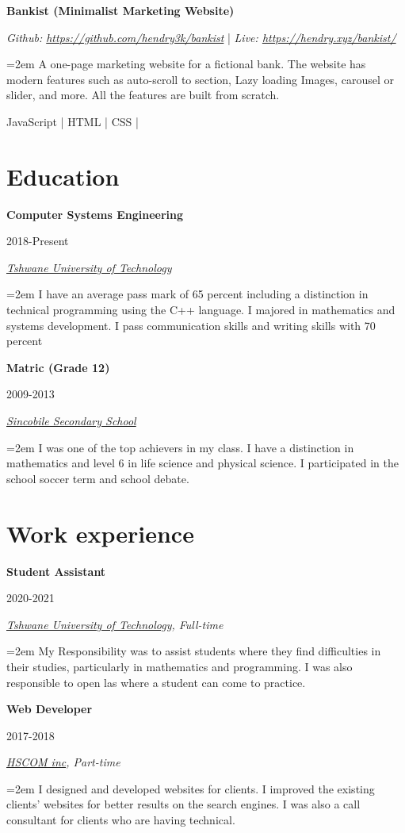 \documentclass[papei=a4,fontsize=12pt]{scrartcl} %
\newcommand{\sepspace}{\vspace*{1em}}		%
\newcommand{\NewPart}[1]{\section*{#1}}
\newcommand{\EducationEntry}[4]{
		\noindent \textbf{#1} \hfill      %
		\colorbox{Black!50}{%
			\parbox{6em}{%
			\hfill\color{White}#2}} \par  %
		\noindent \textit{#3} \par        %
		\noindent\hangindent=2em\hangafter=0 \small #4 %
		\normalsize \par}
\newcommand{\ProjectsEntry}[8]{				  %
		\noindent \textbf{#1} \hfill \par     %
    \noindent \textit{#2} | \textit{#3} \par              %
    \noindent\hangindent=2em\hangafter=0 \small #4 \par %
    \noindent \small #5 | #6 | #7 | #8 \par              %
		\normalsize \par}
\begin{document}
\ProjectsEntry{Bankist (Minimalist Marketing Website)}
{Github: \href{https://github.com/hendry3k/bankist}{https://github.com/hendry3k/bankist}}{Live: \href{https://hendry.xyz/bankist/}{https://hendry.xyz/bankist/} }
{A one-page marketing website for a fictional bank. The website has modern features such as auto-scroll to section, Lazy loading Images, carousel or slider, and more.  All the features are built from scratch.}
{JavaScript}{HTML}{CSS}{}
\sepspace
  

\NewPart{Education}{}

\EducationEntry{Computer Systems Engineering}{2018-Present}{\href{https://www.tut.ac.za/}
{Tshwane University of Technology}}{I have an average pass mark of 
65 percent including a distinction in technical programming using the C++ language. I majored in mathematics and systems 
development. I pass communication skills and writing skills with 70 percent}
\sepspace

\pagebreak

\EducationEntry{Matric (Grade 12)}{2009-2013}
{\href{https://sincobilesecondaryschool.co.za/}{Sincobile Secondary School}}
{I was one of the top achievers in my class. I have a distinction in mathematics and level 6 in life science and physical science. I participated in the school soccer term and school debate.}

\NewPart{Work experience}{}



\EducationEntry{Student Assistant}{2020-2021}
{\href{https://www.tut.ac.za/} {Tshwane University of Technology}, Full-time}
{My Responsibility was to assist students where they find difficulties in their studies, particularly in mathematics and programming. I was also responsible to open las where a student can come to practice.}
\sepspace

\EducationEntry{Web Developer}{2017-2018}
{\href{https://www.hscom.co.za/} {HSCOM inc}, Part-time}
{I designed and developed websites for clients. I improved the existing clients’ websites for better results on the search engines. I was also a call consultant for clients who are having technical.}
\end{document}
